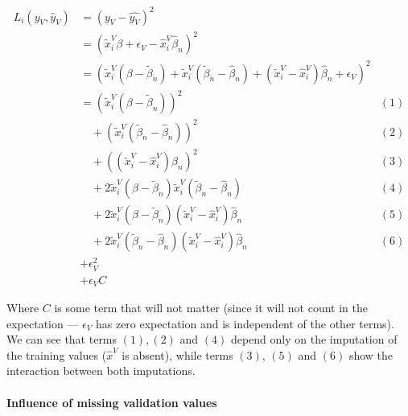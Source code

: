 \begin{align*}
L_i(y_V, \hat{y}_V) &= (y_V - \hat{y_V})^2 &\\
				&= (\tilde{x}_i^V \beta + \epsilon_V - \hat{x}_i^V \hat{\beta}_n)^2 &\\
				   &= (\tilde{x}_i^V(\beta - \tilde{\beta}_n) + \tilde{x}_i^V (\tilde{\beta}_n - \hat{\beta}_n) + (\tilde{x}_i^V - \hat{x}_i^V) \hat{\beta}_n + \epsilon_V)^2 & \\
				   &= (\tilde{x}_i^V (\beta - \tilde{\beta}_n))^2 & (1) \\
				   & \quad + (\tilde{x}_i^V (\tilde{\beta}_n-\hat{\beta}_n))^2 &(2) \\
				   & \quad + ((\tilde{x}_i^V - \hat{x}_i^V) \hat{\beta}_n)^2 &(3) \\
				   & \quad +2 \tilde{x}_i^V (\beta - \tilde{\beta}_n) \tilde{x}_i^V (\tilde{\beta}_n - \hat{\beta}_n) & (4) \\
				   & \quad +2 \tilde{x}_i^V (\beta - \tilde{\beta}_n) (\tilde{x}_i^V - \hat{x}_i^V )\hat{\beta}_n & (5) \\
				   & \quad +2 \tilde{x}_i^V (\tilde{\beta}_n - \hat{\beta}_n) (\tilde{x}_i^V - \hat{x}_i^V) \hat{\beta}_n & (6)\\
				   & + \epsilon_V^2 &\\
				   & + \epsilon_V C
\end{align*}

Where $C$ is some term that will not matter (since it will not count in the expectation --- $\epsilon_V$ has zero expectation and is independent of the other terms). We can see that terms $(1), (2)$ and $(4)$ depend only on the imputation of the training values ($\hat{x}^V$ is absent), while terms $(3)$, $(5)$ and $(6)$ show the interaction between both imputations.

\paragraph{Influence of missing validation values}

